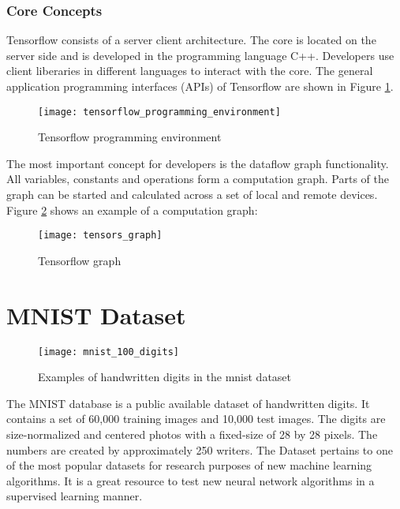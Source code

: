 \subsubsection*{Core Concepts}

Tensorflow consists of a server client architecture.
The core is located on the server side and is developed in the programming language C++.
Developers use client liberaries in different languages to interact with the core.
The general application programming interfaces (APIs) of Tensorflow are shown in Figure \ref{fig:tensorflow_programming_environment_image}.

\begin{figure}[H]
    \centering
    \texttt{[image: tensorflow\_programming\_environment]}
    \caption{\cite{tensorflow_programming_environment_image} Tensorflow programming environment}
    \label{fig:tensorflow_programming_environment_image}
\end{figure}

The most important concept for developers is the dataflow graph functionality.
All variables, constants and operations form a computation graph.
Parts of the graph can be started and calculated across a set of local and remote devices.
Figure \ref{fig:tensorflow_graph_image} shows an example of a computation graph:

\begin{figure}[H]
    \centering
    \texttt{[image: tensors\_graph]}
    \caption{\cite{tensorflow_graph_image} Tensorflow graph}
    \label{fig:tensorflow_graph_image}
\end{figure}

\section{MNIST Dataset}

\begin{figure}[H]
    \centering
    \texttt{[image: mnist\_100\_digits]}
    \caption{\cite{mnist_examples_image} Examples of handwritten digits in the mnist dataset}
    \label{fig:mnist_examples}
\end{figure}

The MNIST database is a public available dataset of handwritten digits.
It contains a set of 60,000 training images and 10,000 test images.
The digits are size-normalized and centered photos with a fixed-size of 28 by 28 pixels.
The numbers are created by approximately 250 writers. 
\cite{mnist-database}
The Dataset pertains to one of the most popular datasets for research purposes of new machine learning algorithms.
It is a great resource to test new neural network algorithms in a supervised learning manner.

